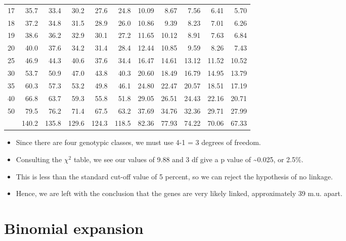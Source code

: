 \documentclass[11pt,ignorenonframetext,aspectratio=169]{beamer}
\providecommand{\tightlist}{%
  \setlength{\itemsep}{0pt}\setlength{\parskip}{0pt}}
\begin{document}
\begin{frame}{}
\begin{table}
\begin{tabular}[t]{lrrrr|>{}rrrrrr}
\rowcolor{gray!6}  17 & 35.7 & 33.4 & 30.2 & 27.6 & 24.8 & 10.09 & 8.67 & 7.56 & 6.41 & 5.70\\
18 & 37.2 & 34.8 & 31.5 & 28.9 & 26.0 & 10.86 & 9.39 & 8.23 & 7.01 & 6.26\\
\rowcolor{gray!6}  19 & 38.6 & 36.2 & 32.9 & 30.1 & 27.2 & 11.65 & 10.12 & 8.91 & 7.63 & 6.84\\
20 & 40.0 & 37.6 & 34.2 & 31.4 & 28.4 & 12.44 & 10.85 & 9.59 & 8.26 & 7.43\\
\addlinespace
\rowcolor{gray!6}  25 & 46.9 & 44.3 & 40.6 & 37.6 & 34.4 & 16.47 & 14.61 & 13.12 & 11.52 & 10.52\\
30 & 53.7 & 50.9 & 47.0 & 43.8 & 40.3 & 20.60 & 18.49 & 16.79 & 14.95 & 13.79\\
\rowcolor{gray!6}  35 & 60.3 & 57.3 & 53.2 & 49.8 & 46.1 & 24.80 & 22.47 & 20.57 & 18.51 & 17.19\\
40 & 66.8 & 63.7 & 59.3 & 55.8 & 51.8 & 29.05 & 26.51 & 24.43 & 22.16 & 20.71\\
\rowcolor{gray!6}  50 & 79.5 & 76.2 & 71.4 & 67.5 & 63.2 & 37.69 & 34.76 & 32.36 & 29.71 & 27.99\\
\addlinespace
100 & 140.2 & 135.8 & 129.6 & 124.3 & 118.5 & 82.36 & 77.93 & 74.22 & 70.06 & 67.33\\
\bottomrule
\end{tabular}
\end{table}
\end{frame}

\begin{frame}{}
\protect\hypertarget{section-6}{}
\begin{itemize}
\tightlist
\item
  Since there are four genotypic classes, we must use 4-1 = 3 degrees of
  freedom.
\item
  Consulting the \(\chi^2\) table, we see our values of 9.88 and 3 df
  give a p value of \textasciitilde0.025, or 2.5\%.
\item
  This is less than the standard cut-off value of 5 percent, so we can
  reject the hypothesis of no linkage.
\item
  Hence, we are left with the conclusion that the genes are very likely
  linked, approximately 39 m.u. apart.
\end{itemize}
\end{frame}

\hypertarget{binomial-expansion}{%
\section{Binomial expansion}\label{binomial-expansion}}
\end{document}
